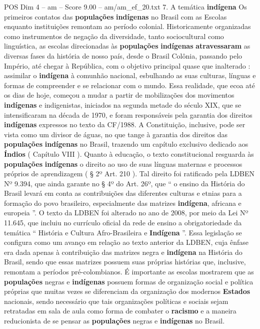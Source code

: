\begin{textsample}{POS Dim 4 – am – Score 9.00 – am/am\_ef\_20.txt}  \label{ex:f4_pos_109}
7.
A temática \textbf{indígena} Os primeiros contatos das \textbf{populações} \textbf{indígenas} no Brasil com as Escolas enquanto instituições remontam ao período colonial.
Historicamente organizadas como instrumentos de negação da diversidade, tanto sociocultural como linguística, as escolas direcionadas às \textbf{populações} \textbf{indígenas} \textbf{atravessaram} as diversas fases da história de nosso país, desde o Brasil Colônia, passando pelo Império, até chegar à República, com o objetivo principal quase que inalterado : assimilar o \textbf{indígena} à comunhão nacional, esbulhando as suas culturas, línguas e formas de compreender e se relacionar com o mundo.
Essa realidade, que ecoa até os dias de hoje, começou a mudar a partir de mobilizações dos movimentos \textbf{indígenas} e indigenistas, iniciados na segunda metade do século XIX, que se intensificaram na década de 1970, e foram responsáveis pela garantia dos direitos \textbf{indígenas} expressos no texto da CF/1988.
A Constituição, inclusive, pode ser vista como um divisor de águas, no que tange à garantia dos direitos das \textbf{populações} \textbf{indígenas} no Brasil, trazendo um capítulo exclusivo dedicado aos \textbf{Índios} ( Capítulo VIII ).
Quanto à educação, o texto constitucional resguarda às \textbf{populações} \textbf{indígenas} o direito ao uso de suas línguas maternas e processos próprios de aprendizagem ( § 2º Art. 210 ).
Tal direito foi ratificado pela LDBEN Nº 9.394, que ainda garante no § 4º do Art. 26º, que “ o ensino da História do Brasil levará em conta as contribuições das diferentes culturas e etnias para a formação do povo brasileiro, especialmente das matrizes \textbf{indígena}, africana e europeia ”.
O texto da LDBEN foi alterado no ano de 2008, por meio da Lei Nº 11.645, que incluiu no currículo oficial da rede de ensino a obrigatoriedade da temática “ História e Cultura Afro-Brasileira e \textbf{Indígena} ”.
Essa legislação se configura como um avanço em relação ao texto anterior da LDBEN, cuja ênfase era dada apenas à contribuição das matrizes negra e \textbf{indígena} na História do Brasil, sendo que essas matrizes possuem suas próprias histórias que, inclusive, remontam a períodos pré-colombianos.
É importante as escolas mostrarem que as \textbf{populações} negras e \textbf{indígenas} possuem formas de organização social e política próprias que muitas vezes se diferenciam da organização dos modernos \textbf{Estados} nacionais, sendo necessário que tais organizações políticas e sociais sejam retratadas em sala de aula como forma de combater o \textbf{racismo} e a maneira reducionista de se pensar as \textbf{populações} negras e \textbf{indígenas} no Brasil.

\end{textsample}
